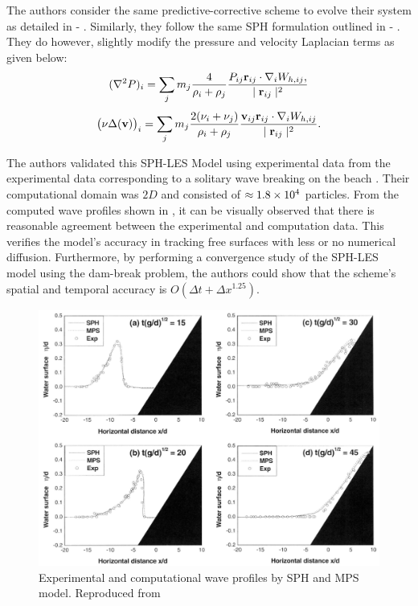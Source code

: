 The authors consider the same predictive-corrective scheme to evolve their system as detailed in  - .
Similarly, they follow the same SPH formulation outlined in  - . They do however, slightly modify the pressure and velocity Laplacian terms as given below:
\begin{equation}
    (\nabla^2 P)_i = \sum_j m_j \frac{4}{\rho_i + \rho_j} \frac{P_{ij} \mathbf{r}_{ij} \cdot \nabla_{i} W_{h, ij}, }{\mid \mathbf{r}_{ij} \mid^{2}}
    \label{eq:Shao2005-P-laplacian-sph}
\end{equation}
\begin{equation}
    \big(\nu \Delta(\mathbf{v}) \big)_i = \sum_j m_j \frac{2(\nu_i + \nu_j)}{\rho_i + \rho_j}\frac{\mathbf{v}_{ij} \mathbf{r}_{ij} \cdot \nabla_{i} W_{h, ij}}{\mid \mathbf{r}_{ij} \mid^{2}}.
    \label{eq:Shao2005-vel-laplacian-sph}
\end{equation}

The authors validated this SPH-LES Model using experimental data from the experimental data corresponding to a solitary wave breaking on the beach \parencite{Synolakis1986}. Their computational domain was $2D$ and consisted of $\approx 1.8 \times {10}^{4}$ particles. 
From the computed wave profiles shown in , it can be visually observed that there is reasonable agreement between the experimental and computation data. This verifies the model’s accuracy in tracking free surfaces with less or no numerical diffusion.
Furthermore, by performing a convergence study of the SPH-LES model using the dam-break problem, the authors could show that the scheme’s spatial and temporal accuracy is $O(\Delta t + \Delta x^{1.25})$.

\begin{figure}[htbp!]
    \centering
    \includegraphics[scale=0.6]{Figures/research_papers/shao2005-wave-profile-result.png}
    \caption{Experimental and computational wave profiles by SPH and MPS model. Reproduced from \cite{Shao2005}}
    \label{fig:shao2005-wave-profile-result}
\end{figure}


